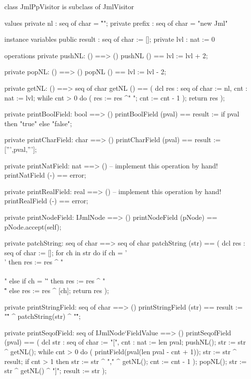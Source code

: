 \begin{vdm_al}
class JmlPpVisitor is subclass of JmlVisitor

values
  private nl : seq of char = "\r\n";
  private prefix : seq of char = "new Jml"

instance variables
  public result : seq of char := [];
  private lvl : nat := 0

operations
  private pushNL: () ==> ()
  pushNL () == lvl := lvl + 2;

  private popNL: () ==> ()
  popNL () == lvl := lvl - 2;

  private getNL: () ==> seq of char
  getNL () ==
    ( dcl res : seq of char := nl, cnt : nat := lvl;
      while cnt > 0 do ( res := res ^" "; cnt := cnt - 1 );
      return res );

  private printBoolField: bool ==> ()
  printBoolField (pval) ==
    result := if pval then "true" else "false";

  private printCharField: char ==> ()
  printCharField (pval) ==
    result := [''',pval,'''];

  private printNatField: nat ==> ()
  -- implement this operation by hand!
  printNatField (-) == error;

  private printRealField: real ==> ()
  -- implement this operation by hand!
  printRealField (-) == error;

  private printNodeField: IJmlNode ==> ()
  printNodeField (pNode) == pNode.accept(self);

  private patchString: seq of char ==> seq of char
  patchString (str) ==
   ( dcl res : seq of char := [];
     for ch in str do
       if ch = '\\' then res := res ^ "\\\\"
       else if ch = '\"' then res := res ^ "\\\""
       else res := res ^ [ch];
     return res );

  private printStringField: seq of char ==> ()
  printStringField (str) == result := "\"" ^ patchString(str) ^ "\"";

  private printSeqofField: seq of IJmlNode`FieldValue ==> ()
  printSeqofField (pval) ==
    ( dcl str : seq of char := "[", cnt : nat := len pval;
      pushNL();
      str := str ^ getNL();
      while cnt > 0 do
        ( printField(pval(len pval - cnt + 1));
          str := str ^ result;
          if cnt > 1
          then str := str ^ "," ^ getNL();
          cnt := cnt - 1 ); 
      popNL();
      str := str ^ getNL() ^ "]";
      result := str );


\end{vdm_al}
